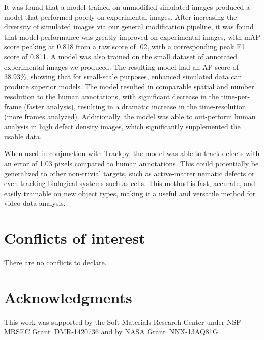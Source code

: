 \documentclass[twoside,twocolumn,9pt]{article}
\renewcommand{\refname}{Notes and references}
\begin{document}
It was found that a model trained on unmodified simulated images produced a model that performed poorly on experimental images. After increasing the diversity of simulated images via our general modification pipeline, it was found that model performance was greatly improved on experimental images, with mAP score peaking at 0.818 from a raw score of .02, with a corresponding peak F1 score of 0.811. A model was also trained on the small dataset of annotated experimental images we produced. The resulting model had an AP score of 38.93\%, showing that for small-scale purposes, enhanced simulated data can produce superior models.
The model resulted in comparable spatial and number resolution to the human annotations, with significant decrease in the time-per-frame (faster analysis), resulting in a dramatic increase in the time-resolution (more frames analyzed). Additionally, the model was able to out-perform human analysis in high defect density images, which significantly supplemented the usable data.

When used in conjunction with Trackpy, the model was able to track defects with an error of 1.03 pixels compared to human annotations. This could potentially be generalized to other non-trivial targets, such as active-matter nematic defects\cite{GiomiDefectdynamicsactive2014,DeCampOrientationalordermotile2015} or even tracking biological systems such as cells\cite{MeijeringTrackingcelldevelopmental2009}. This method is fast, accurate, and easily trainable on new object types, making it a useful and versatile method for video data analysis.


\section*{Conflicts of interest}
There are no conflicts to declare.

\section{Acknowledgments}
This work was supported by the Soft Materials Research Center under NSF MRSEC Grant~DMR-1420736 and  by NASA Grant~NNX-13AQ81G.



\balance


\end{document}
